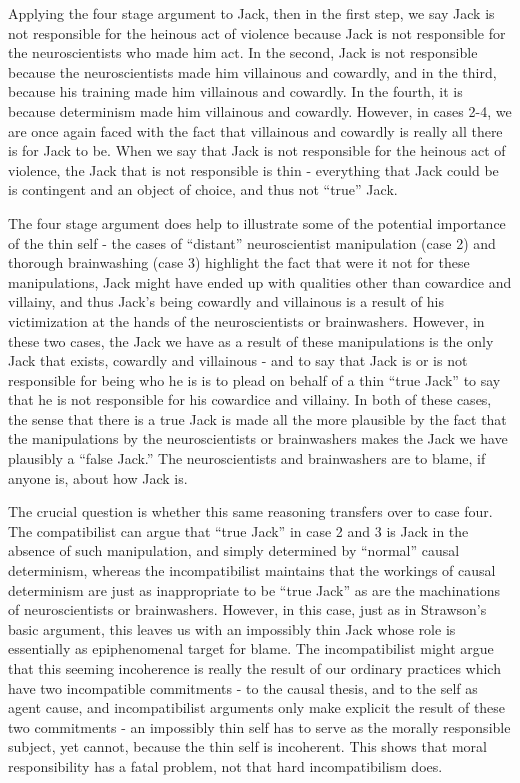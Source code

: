 \documentclass[phd,12pt,oneside,paper=letterpaper]{ubcthesis}
\begin{document}
Applying the four stage argument to Jack, then in the first step, we say Jack is not responsible for the heinous act of violence because Jack is not responsible for the neuroscientists who made him act. In the second, Jack is not responsible because the neuroscientists made him villainous and cowardly, and in the third, because his training made him villainous and cowardly. In the fourth, it is because  determinism made him villainous and cowardly. However, in cases 2-4, we are once again faced with the fact that villainous and cowardly is really all there is for Jack to be. When we say that Jack is not responsible for the heinous act of violence, the Jack that is not responsible is thin - everything that Jack could be is contingent and an object of choice, and thus not ``true'' Jack.  

The four stage argument does help to illustrate some of the potential importance of the thin self - the cases of ``distant'' neuroscientist manipulation (case 2) and thorough brainwashing (case 3) highlight the fact that were it not for these manipulations, Jack might have ended up with qualities other than cowardice and villainy, and thus Jack's being cowardly and villainous is a result of his victimization at the hands of the neuroscientists or brainwashers. However, in these two cases, the Jack we have as a result of these manipulations is the only Jack that exists, cowardly and villainous - and  to say that Jack is or is not responsible for being who he is is to plead on behalf of a thin ``true Jack'' to say that he is not responsible for his cowardice and villainy. In both of these cases, the sense that there is a true Jack is made all the more plausible by the fact that the manipulations by the neuroscientists or brainwashers makes the Jack we have plausibly a ``false Jack.'' The neuroscientists and brainwashers are to blame, if anyone is, about how Jack is. 

The crucial question is whether this same reasoning transfers over to case four. The compatibilist can argue that ``true Jack'' in case 2 and 3 is Jack in the absence of such manipulation, and simply determined by ``normal'' causal determinism, whereas the incompatibilist maintains that the workings of causal determinism are just as inappropriate to be ``true Jack'' as are the machinations of neuroscientists or brainwashers. However, in this case, just as in Strawson's basic argument, this leaves us with an impossibly thin Jack whose role is essentially as epiphenomenal target for blame. 
The incompatibilist might argue that this seeming incoherence is really the result of our ordinary practices which have two incompatible commitments - to the causal thesis, and to the self as agent cause, and incompatibilist arguments only make explicit the result of these two commitments - an impossibly thin self has to serve as the morally responsible subject, yet cannot, because the thin self is incoherent. This shows that moral responsibility has a fatal problem, not that hard incompatibilism does. 
\end{document}
